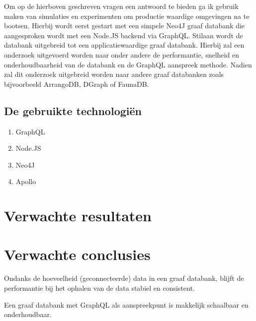 Om op de hierboven geschreven vragen een antwoord te bieden ga ik gebruik maken van simulaties en experimenten om productie waardige omgevingen na te bootsen. Hierbij wordt eerst gestart met een simpele Neo4J graaf databank die aangesproken wordt met een Node.JS backend via GraphQL. Stilaan wordt de databank uitgebreid tot een applicatiewaardige graaf databank. Hierbij  zal een onderzoek uitgevoerd worden naar onder andere de performantie, snelheid en onderhoudbaarheid van de databank en de GraphQL aanspreek methode. Nadien zal dit onderzoek uitgebreid worden naar andere graaf databanken zoals bijvoorbeeld ArrangoDB, DGraph of FaunaDB.

\subsection{De gebruikte technologiën}
\begin{enumerate}
	\item GraphQL
	\item Node.JS
	\item Neo4J
	\item Apollo
\end{enumerate}

\section{Verwachte resultaten}
\label{sec:verwachte_resultaten}


\section{Verwachte conclusies}
\label{sec:verwachte_conclusies}

Ondanks de hoeveelheid (geconnecteerde) data in een graaf databank, blijft de performantie bij het ophalen van de data stabiel en consistent.

Een graaf databank met GraphQL als aanspreekpunt is makkelijk schaalbaar en onderhoudbaar.


